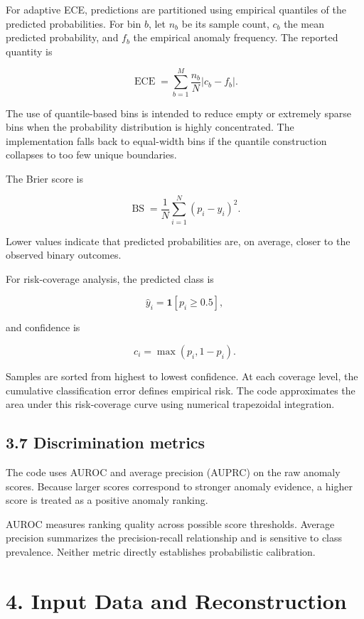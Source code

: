 \documentclass[
  11pt,
]{article}
\begin{document}
For adaptive ECE, predictions are partitioned using empirical quantiles
of the predicted probabilities. For bin \(b\), let \(n_b\) be its sample
count, \(c_b\) the mean predicted probability, and \(f_b\) the empirical
anomaly frequency. The reported quantity is

\[
\operatorname{ECE}
=
\sum_{b=1}^{M}
\frac{n_b}{N}
\left|c_b-f_b\right|.
\]

The use of quantile-based bins is intended to reduce empty or extremely
sparse bins when the probability distribution is highly concentrated.
The implementation falls back to equal-width bins if the quantile
construction collapses to too few unique boundaries.

The Brier score is

\[
\operatorname{BS}
=
\frac{1}{N}
\sum_{i=1}^{N}
\left(p_i-y_i\right)^2.
\]

Lower values indicate that predicted probabilities are, on average,
closer to the observed binary outcomes.

For risk-coverage analysis, the predicted class is

\[
\hat y_i=\mathbf{1}[p_i\ge 0.5],
\]

and confidence is

\[
c_i=\max(p_i,1-p_i).
\]

Samples are sorted from highest to lowest confidence. At each coverage
level, the cumulative classification error defines empirical risk. The
code approximates the area under this risk-coverage curve using
numerical trapezoidal integration.

\subsection{3.7 Discrimination metrics}\label{discrimination-metrics}

The code uses AUROC and average precision (AUPRC) on the raw anomaly
scores. Because larger scores correspond to stronger anomaly evidence, a
higher score is treated as a positive anomaly ranking.

AUROC measures ranking quality across possible score thresholds. Average
precision summarizes the precision-recall relationship and is sensitive
to class prevalence. Neither metric directly establishes probabilistic
calibration.

\section{4. Input Data and
Reconstruction}\label{input-data-and-reconstruction}
\end{document}
